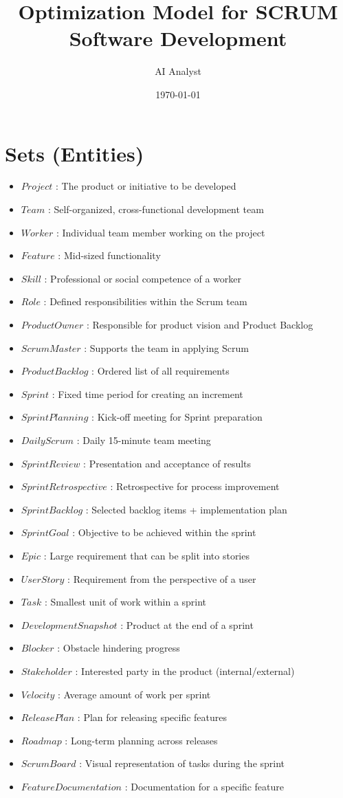 \documentclass{article}
\title{Optimization Model for SCRUM Software Development}
\author{AI Analyst}
\date{\today}
\begin{document}
\maketitle
\tableofcontents

\section{Sets (Entities)}
\begin{itemize}
    \item $Project$ : The product or initiative to be developed
    \item $Team$ : Self-organized, cross-functional development team
    \item $Worker$ : Individual team member working on the project
    \item $Feature$ : Mid-sized functionality
    \item $Skill$ : Professional or social competence of a worker
    \item $Role$ : Defined responsibilities within the Scrum team
    \item $ProductOwner$ : Responsible for product vision and Product Backlog
    \item $ScrumMaster$ : Supports the team in applying Scrum
    \item $ProductBacklog$ : Ordered list of all requirements
    \item $Sprint$ : Fixed time period for creating an increment
    \item $SprintPlanning$ : Kick-off meeting for Sprint preparation
    \item $DailyScrum$ : Daily 15-minute team meeting
    \item $SprintReview$ : Presentation and acceptance of results
    \item $SprintRetrospective$ : Retrospective for process improvement
    \item $SprintBacklog$ : Selected backlog items + implementation plan
    \item $SprintGoal$ : Objective to be achieved within the sprint
    \item $Epic$ : Large requirement that can be split into stories
    \item $UserStory$ : Requirement from the perspective of a user
    \item $Task$ : Smallest unit of work within a sprint
    \item $DevelopmentSnapshot$ : Product at the end of a sprint
    \item $Blocker$ : Obstacle hindering progress
    \item $Stakeholder$ : Interested party in the product (internal/external)
    \item $Velocity$ : Average amount of work per sprint
    \item $ReleasePlan$ : Plan for releasing specific features
    \item $Roadmap$ : Long-term planning across releases
    \item $ScrumBoard$ : Visual representation of tasks during the sprint
    \item $FeatureDocumentation$ : Documentation for a specific feature
\end{itemize}
\end{document}
